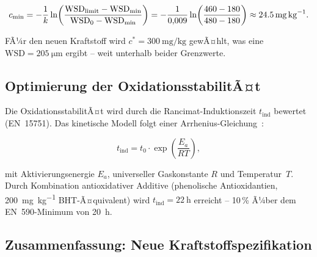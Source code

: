 ﻿\documentclass[12pt,a4paper]{article}
\newcommand{\WSD}{\ensuremath{\mathrm{WSD}}}
\begin{document}
\begin{equation}
  c_{\min} = -\frac{1}{k} \ln\!\left(\frac{\WSD_{\mathrm{limit}} - \WSD_{\min}}
  {\WSD_0 - \WSD_{\min}}\right)
  = -\frac{1}{0{,}009} \ln\!\left(\frac{460-180}{480-180}\right)
  \approx \SI{24{,}5}{\mg\per\kg}.
\end{equation}

FÃ¼r den neuen Kraftstoff wird $c^* = \SI{300}{\mg\per\kg}$ gewÃ¤hlt,
was eine $\WSD = \SI{205}{\micro\m}$ ergibt -- weit unterhalb beider Grenzwerte.

\subsection{Optimierung der OxidationsstabilitÃ¤t}
\label{sec:kraftstoff_oxidation}

Die OxidationsstabilitÃ¤t wird durch die Rancimat-Induktionszeit $t_{\mathrm{ind}}$
bewertet (EN~15751). Das kinetische Modell folgt einer Arrhenius-Gleichung~\cite{schober2006}:

\begin{equation}
  t_{\mathrm{ind}} = t_0 \cdot \exp\!\left(\frac{E_a}{R T}\right),
  \label{eq:arrhenius_ind}
\end{equation}

mit Aktivierungsenergie $E_a$, universeller Gaskonstante $R$ und Temperatur~$T$.
Durch Kombination antioxidativer Additive (phenolische Antioxidantien,
\SI{200}{\mg\per\kg} BHT-Ã¤quivalent) wird $t_{\mathrm{ind}} = \SI{22}{\hour}$
erreicht -- 10\,\% Ã¼ber dem EN~590-Minimum von \SI{20}{\hour}.

\subsection{Zusammenfassung: Neue Kraftstoffspezifikation}
\label{sec:kraftstoff_spezifikation}
\end{document}
